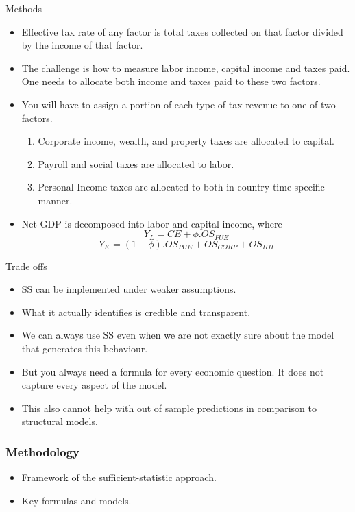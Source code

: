 \documentclass{beamer}
\begin{document}
\begin{frame}{Methods}
\begin{itemize}
\item Effective tax rate of any factor is total taxes collected on that factor divided by the income of that factor. 
\item The challenge is how to measure labor income, capital income and taxes paid. One needs to allocate both income and taxes paid to these two factors. 
\item You will have to assign a portion of each type of tax revenue to one of two factors. 
\begin{enumerate}
    \item Corporate income, wealth, and property taxes are allocated to capital. 
    \item Payroll and social taxes are allocated to labor. 
    \item Personal Income taxes are allocated to both in country-time specific manner.
\end{enumerate}
\item Net GDP is decomposed into labor and capital income, where 
\[Y_L = CE+ \phi.OS_{PUE} \]
\[Y_K = (1-\phi) . OS_{PUE}+OS_{CORP}+ OS_{HH}\]

\end{itemize}
\end{frame}

\begin{frame}{Trade offs}
\begin{itemize}
    \item SS can be implemented under weaker assumptions. 
    \item What it actually identifies is credible and transparent. 
    \item We can always use SS even when we are not exactly sure about the model that generates this behaviour. 
    \item But you always need a formula for every economic question. It does not capture every aspect of the model. 
    \item This also cannot help with out of sample predictions in comparison to structural models.
\end{itemize}    
\end{frame}

\begin{frame}
\frametitle{Methodology}
\begin{itemize}
    \item Framework of the sufficient-statistic approach.
    \item Key formulas and models.
\end{itemize}
\end{frame}
\end{document}
